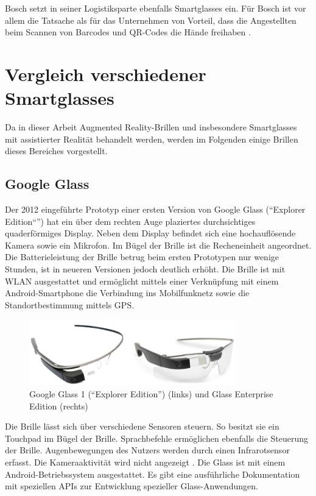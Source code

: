 Bosch setzt in seiner Logistiksparte ebenfalls Smartglasses ein. Für Bosch ist vor allem die Tatsache als für das Unternehmen von Vorteil, dass die Angestellten beim Scannen von Barcodes und QR-Codes die Hände freihaben \cite{Spinger2014}. 
%
%
%
%
%
%
\section{Vergleich verschiedener Smartglasses}
\label{sec:VergleichSmartglasses}
Da in dieser Arbeit Augmented Reality-Brillen und insbesondere Smartglasses mit assistierter Realität behandelt werden, werden im Folgenden einige Brillen dieses Bereiches vorgestellt.
%
%
%
%
%
%
\subsection{Google Glass}
Der 2012 eingeführte Prototyp einer ersten Version von Google Glass (\enquote{Explorer Edition“}) hat ein über dem rechten Auge plaziertes durchsichtiges quaderförmiges Display. Neben dem Display befindet sich eine hochauflösende Kamera sowie ein Mikrofon. Im Bügel der Brille ist die Recheneinheit angeordnet. Die Batterieleistung der Brille betrug beim ersten Prototypen nur wenige Stunden, ist in neueren Versionen jedoch deutlich erhöht. Die Brille ist mit WLAN ausgestattet und ermöglicht mittels einer Verknüpfung mit einem Android-Smartphone die Verbindung ins Mobilfunknetz sowie die Standortbestimmung mittels GPS.
%
\begin{figure}[htbp]
    \centering
    \includegraphics[width=0.8\textwidth]{data/bilder/Glass_1_und_2.png}
    \caption{Google Glass 1 (\enquote{Explorer Edition}) \cite{Reckmann2014a} (links) und Glass Enterprise Edition \cite{Huvelin2017} (rechts)}
    \label{fig:GlassModel}
\end{figure}
%

Die Brille lässt sich über verschiedene Sensoren steuern. So besitzt sie ein Touchpad im Bügel der Brille. Sprachbefehle ermöglichen ebenfalls die Steuerung der Brille. Augenbewegungen des Nutzers werden durch einen Infrarotsensor erfasst. Die Kameraaktivität wird nicht angezeigt \cite[S.~30]{Schwenke2016}. Die Glass ist mit einem Android-Betriebssystem ausgestattet. Es gibt eine ausführliche Dokumentation mit speziellen APIs zur Entwicklung spezieller Glass-Anwendungen.

